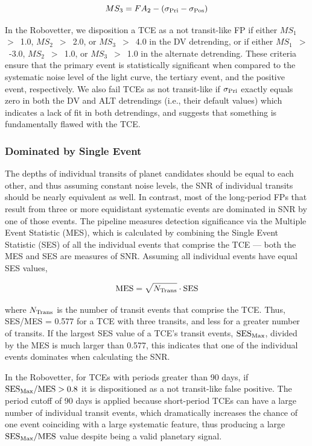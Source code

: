 \begin{equation}
    MS_{3} = FA_{2} - (\sigma_{\rm Pri} - \sigma_{\rm Pos})
\end{equation}

In the Robovetter, we disposition a TCE as a not transit-like FP if either $MS_{1}$~$>$~1.0, $MS_{2}$~$>$~2.0, or $MS_{3}$~$>$~4.0 in the DV detrending, or if either $MS_{1}$~$>$~-3.0, $MS_{2}$~$>$~1.0, or $MS_{3}$~$>$~1.0 in the alternate detrending. These criteria ensure that the primary event is statistically significant when compared to the systematic noise level of the light curve, the tertiary event, and the positive event, respectively. We also fail TCEs as not transit-like if $\sigma_{\rm Pri}$ exactly equals zero in both the DV and ALT detrendings (i.e., their default values) which indicates a lack of fit in both detrendings, and suggests that something is fundamentally flawed with the TCE.


\subsubsection{Dominated by Single Event}
\label{s:sesmes}

The depths of individual transits of planet candidates should be equal to each other, and thus assuming constant noise levels, the SNR of individual transits should be nearly equivalent as well. In contrast, most of the long-period FPs that result from three or more equidistant systematic events are dominated in SNR by one of those events. The \kepler{} pipeline measures detection significance via the Multiple Event Statistic (MES), which is calculated by combining the Single Event Statistic (SES) of all the individual events that comprise the TCE --- both the MES and SES are measures of SNR. Assuming all individual events have equal SES values,

\begin{equation}
{\rm MES} = \sqrt{N_{\rm Trans}} \cdot {\rm SES}
\end{equation}

\noindent where $N_{\rm Trans}$ is the number of transit events that comprise the TCE. Thus, SES/MES = 0.577 for a TCE with three transits, and less for a greater number of transits. If the largest SES value of a TCE's transit events, ${\rm SES}_{\rm Max}$, divided by the MES is much larger than 0.577, this indicates that one of the individual events dominates when calculating the SNR.

In the Robovetter, for TCEs with periods greater than 90 days, if ${{\rm SES}_{\rm Max} / {\rm MES} > 0.8}$ it is dispositioned as a not transit-like false positive. The period cutoff of 90 days is applied because short-period TCEs can have a large number of individual transit events, which dramatically increases the chance of one event coinciding with a large systematic feature, thus producing a large ${{\rm SES}_{\rm Max} / {\rm MES}}$ value despite being a valid planetary signal.

